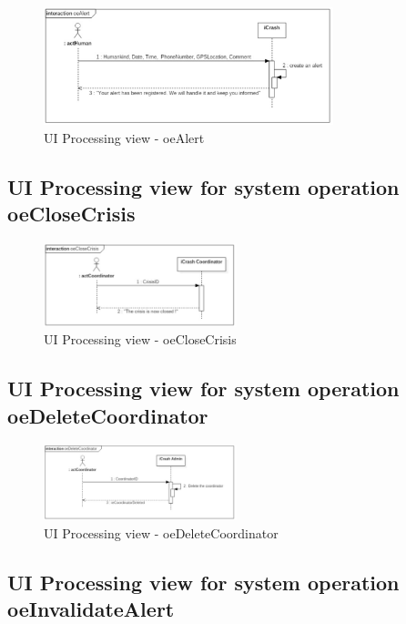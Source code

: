 \begin{figure}[h]
	\centering	
	\captionsetup{justification=centering}
	\includegraphics[width=0.75\textwidth]{./images/ui_oeAlert.eps}
	\caption{UI Processing view - oeAlert}
\end{figure}


\subsection{UI Processing view for system operation oeCloseCrisis}

\begin{figure}[h]
	\centering	
	\captionsetup{justification=centering}
	\includegraphics[width=0.5\textwidth]{./images/ui_oeCloseCrisis.eps}
	\caption{UI Processing view - oeCloseCrisis}
\end{figure}


\subsection{UI Processing view for system operation oeDeleteCoordinator}

\begin{figure}[h]
	\centering	
	\captionsetup{justification=centering}
	\includegraphics[width=0.5\textwidth]{./images/ui_oeDeleteCoordinator.eps}
	\caption{UI Processing view - oeDeleteCoordinator}
\end{figure}


\subsection{UI Processing view for system operation oeInvalidateAlert}

